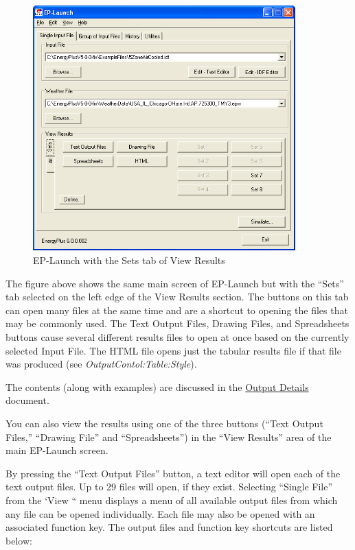 \begin{figure}[hbtp] %
\centering
\includegraphics[width=0.9\textwidth, height=0.9\textheight, keepaspectratio=true]{media/image006.png}
\caption{EP-Launch with the Sets tab of View Results \protect \label{fig:ep-launch-with-the-sets-tab-of-view-results}}
\end{figure}

The figure above shows the same main screen of EP-Launch but with the ``Sets'' tab selected on the left edge of the View Results section. The buttons on this tab can open many files at the same time and are a shortcut to opening the files that may be commonly used. The Text Output Files, Drawing Files, and Spreadsheets buttons cause several different results files to open at once based on the currently selected Input File. The HTML file opens just the tabular results file if that file was produced (see \emph{OutputContol:Table:Style}).

The contents (along with examples) are discussed in the \href{file:///E:/Docs4PDFs/OutputDetailsAndExamples.pdf}{Output Details} document.

You can also view the results using one of the three buttons (``Text Output Files,'' ``Drawing File'' and ``Spreadsheets'') in the ``View Results'' area of the main EP-Launch screen.

By pressing the ``Text Output Files'' button, a text editor will open each of the text output files. Up to 29 files will open, if they exist. Selecting ``Single File'' from the `View `` menu displays a menu of all available output files from which any file can be opened individually. Each file may also be opened with an associated function key. The output files and function key shortcuts are listed below:

